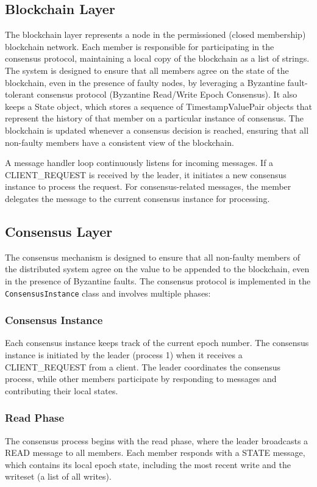 \documentclass[runningheads]{llncs}
\begin{document}
\subsection{Blockchain Layer}
The blockchain layer represents a node in the permissioned (closed membership)
blockchain network. Each member is responsible for participating in the
consensus protocol, maintaining a local copy of the blockchain as a list of
strings. The system is designed to ensure that all members agree on the state of
the blockchain, even in the presence of faulty nodes, by leveraging a Byzantine
fault-tolerant consensus protocol (Byzantine Read/Write Epoch Consensus). It
also keeps a State object, which stores a sequence of TimestampValuePair objects
that represent the history of that member on a particular instance of consensus.
The blockchain is updated whenever a consensus decision is reached, ensuring
that all non-faulty members have a consistent view of the blockchain.

A message handler loop continuously listens for incoming messages. If a
CLIENT\_REQUEST is received by the leader, it initiates a new consensus instance
to process the request. For consensus-related messages, the member delegates the
message to the current consensus instance for processing.

\subsection{Consensus Layer}
The consensus mechanism is designed to ensure that all non-faulty members of the
distributed system agree on the value to be appended to the blockchain, even in
the presence of Byzantine faults. The consensus protocol is implemented in the
\verb|ConsensusInstance| class and involves multiple phases:

\subsubsection{Consensus Instance}
Each consensus instance keeps track of the current epoch number. The consensus
instance is initiated by the leader (process 1) when it receives a
CLIENT\_REQUEST from a client. The leader coordinates the consensus process,
while other members participate by responding to messages and contributing their
local states.

\subsubsection{Read Phase}
The consensus process begins with the read phase, where the leader broadcasts a
READ message to all members. Each member responds with a STATE message, which
contains its local epoch state, including the most recent write and the writeset
(a list of all writes).
\end{document}
